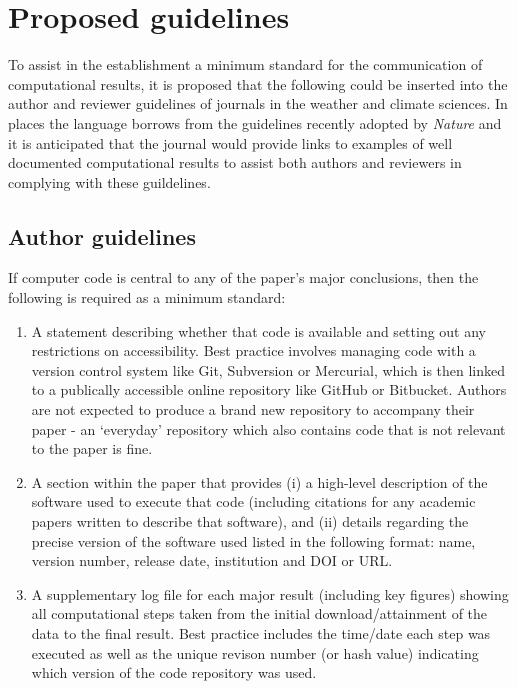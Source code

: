 \section{Proposed guidelines}\label{s:guidelines}

To assist in the establishment a minimum standard for the communication of computational results, it is proposed that the following could be inserted into the author and reviewer guidelines of journals in the weather and climate sciences. In places the language borrows from the guidelines recently adopted by \textit{Nature} \citep{Nature2014} and it is anticipated that the journal would provide links to examples of well documented computational results to assist both authors and reviewers in complying with these guildelines.

\subsection{Author guidelines}

If computer code is central to any of the paper's major conclusions, then the following is required as a minimum standard: 
\begin{enumerate}
\item A statement describing whether that code is available and setting out any restrictions on accessibility. Best practice involves managing code with a version control system like Git, Subversion or Mercurial, which is then linked to a publically accessible online repository like GitHub or Bitbucket. Authors are not expected to produce a brand new repository to accompany their paper - an `everyday' repository which also contains code that is not relevant to the paper is fine.  
\item A section within the paper that provides (i) a high-level description of the software used to execute that code (including citations for any academic papers written to describe that software), and (ii) details regarding the precise version of the software used listed in the following format: name, version number, release date, institution and DOI or URL.
\item A supplementary log file for each major result (including key figures) showing all computational steps taken from the initial download/attainment of the data to the final result. Best practice includes the time/date each step was executed as well as the unique revison number (or hash value) indicating which version of the code repository was used.
\end{enumerate}

